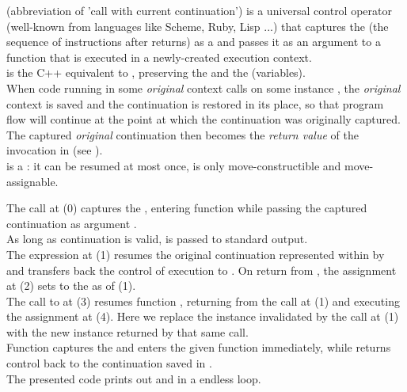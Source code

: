 
\cc (abbreviation of 'call with current continuation') is a universal control
operator (well-known from languages like Scheme, Ruby, Lisp ...) that captures
the \currcont (the sequence of instructions after \cc returns) as a
 and passes it as an argument to a function that is
executed in a newly-created execution context.\\

\call is the C++ equivalent to \cc, preserving the  and the
 (variables).\\

When code running in some \emph{original} context calls \contop on some \cont
instance , the \emph{original} context is saved and
the  continuation is restored in its place, so that program flow
will continue at the point at which the  continuation was
originally captured. The captured \emph{original} continuation then becomes
the \emph{return value} of the \call invocation in 
(see ).\\

\cont is a : it can be resumed at most once, is only
move-constructible and move-assignable.

The  call at (0) captures the \currcont, entering function
 while passing the captured continuation as argument .\\
As long as continuation  is valid,  is passed to standard
output.\\
The expression  at (1) resumes the original
continuation represented within  by  and transfers back the
control of execution to . On return from ,
the assignment at (2) sets  to the \currcont as of (1).\\
The call to  at (3)
resumes function , returning from the \op call at (1) and executing
the assignment at (4). Here we replace the \cont instance 
invalidated by the \op call at (1) with the new instance returned by that
same \op call.\\
Function \call captures the \currcont and enters the given function immediately,
while \op returns control back to the continuation saved in .\\
The presented code prints out  and  in a endless loop.\\

